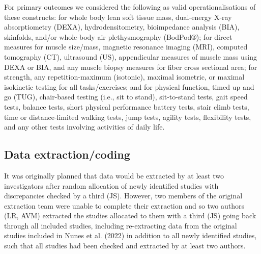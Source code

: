\documentclass[
]{article}
\begin{document}
For primary outcomes we considered the following as valid
operationalisations of these constructs: for whole body lean soft tissue
mass, dual-energy X-ray absorptiometry (DEXA), hydrodensitometry,
bioimpedance analysis (BIA), skinfolds, and/or whole-body air
plethysmography (BodPod®); for direct measures for muscle size/mass,
magnetic resonance imaging (MRI), computed tomography (CT), ultrasound
(US), appendicular measures of muscle mass using DEXA or BIA, and any
muscle biopsy measures for fiber cross sectional area; for strength, any
repetition-maximum (isotonic), maximal isometric, or maximal isokinetic
testing for all tasks/exercises; and for physical function, timed up and
go (TUG), chair-based testing (i.e., sit to stand), sit-to-stand tests,
gait speed tests, balance tests, short physical performance battery
tests, stair climb tests, time or distance-limited walking tests, jump
tests, agility tests, flexibility tests, and any other tests involving
activities of daily life.

\subsection{Data extraction/coding}\label{data-extractioncoding}

It was originally planned that data would be extracted by at least two
investigators after random allocation of newly identified studies with
discrepancies checked by a third (JS). However, two members of the
original extraction team were unable to complete their extraction and so
two authors (LR, AVM) extracted the studies allocated to them with a
third (JS) going back through all included studies, including
re-extracting data from the original studies included in Nunes et al.
(2022) in addition to all newly identified studies, such that all
studies had been checked and extracted by at least two authors.
\end{document}
